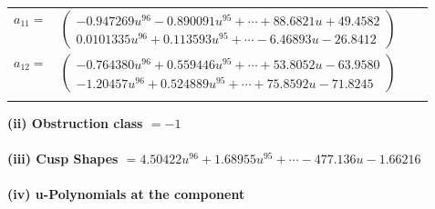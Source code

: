 \documentclass[1p]{elsarticle_modified}
\theoremstyle{definition}
\begin{document}
\begin{tabular}{m{7pt} m{180pt} m{7pt} m{180pt} }
\flushright $a_{11}=$&$\begin{pmatrix}-0.947269 u^{96}-0.890091 u^{95}+\cdots+88.6821 u+49.4582\\0.0101335 u^{96}+0.113593 u^{95}+\cdots-6.46893 u-26.8412\end{pmatrix}$ \\
\flushright $a_{12}=$&$\begin{pmatrix}-0.764380 u^{96}+0.559446 u^{95}+\cdots+53.8052 u-63.9580\\-1.20457 u^{96}+0.524889 u^{95}+\cdots+75.8592 u-71.8245\end{pmatrix}$\\&\end{tabular}
\flushleft \textbf{(ii) Obstruction class $= -1$}\\~\\
\flushleft \textbf{(iii) Cusp Shapes $= 4.50422 u^{96}+1.68955 u^{95}+\cdots-477.136 u-1.66216$}\\~\\
\newpage\renewcommand{\arraystretch}{1}
\flushleft \textbf{(iv) u-Polynomials at the component}\newline \\
\end{document}
